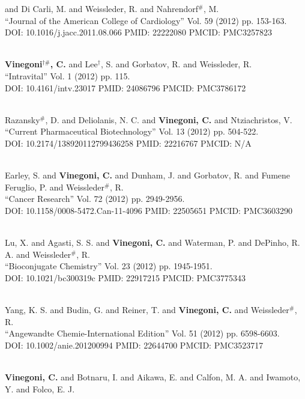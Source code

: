 and Di Carli, M. and Weissleder, R. and Nahrendorf$^\#$, M. \\ ``Journal of the American College of Cardiology'' Vol. 59 (2012) pp. 153-163. \\ DOI: 10.1016/j.jacc.2011.08.066 PMID: 22222080 PMCID: PMC3257823\item {} \\ {\bf Vinegoni$^{\dag \#}$, C.} and Lee$^\dag$, S. and Gorbatov, R. and Weissleder, R. \\ ``Intravital'' Vol. 1 (2012) pp. 115. \\ DOI: 10.4161/intv.23017 PMID: 24086796 PMCID: PMC3786172\item {} \\ Razansky$^\#$, D. and Deliolanis, N. C. and {\bf Vinegoni, C.} and Ntziachristos, V. \\ ``Current Pharmaceutical Biotechnology'' Vol. 13 (2012) pp. 504-522. \\ DOI: 10.2174/138920112799436258 PMID: 22216767 PMCID: N/A\item {} \\ Earley, S. and {\bf Vinegoni, C.} and Dunham, J. and Gorbatov, R. and Fumene Feruglio, P. and Weissleder$^\#$, R. \\ ``Cancer Research'' Vol. 72 (2012) pp. 2949-2956. \\ DOI: 10.1158/0008-5472.Can-11-4096 PMID: 22505651 PMCID: PMC3603290\item {} \\ Lu, X. and Agasti, S. S. and {\bf Vinegoni, C.} and Waterman, P. and DePinho, R. A. and Weissleder$^\#$, R. \\ ``Bioconjugate Chemistry'' Vol. 23 (2012) pp. 1945-1951. \\ DOI: 10.1021/bc300319c PMID: 22917215 PMCID: PMC3775343\item {} \\ Yang, K. S. and Budin, G. and Reiner, T. and {\bf Vinegoni, C.} and Weissleder$^\#$, R. \\ ``Angewandte Chemie-International Edition'' Vol. 51 (2012) pp. 6598-6603. \\ DOI: 10.1002/anie.201200994 PMID: 22644700 PMCID: PMC3523717\item {} \\ {\bf Vinegoni, C.} and Botnaru, I. and Aikawa, E. and Calfon, M. A. and Iwamoto, Y. and Folco, E. J. 
